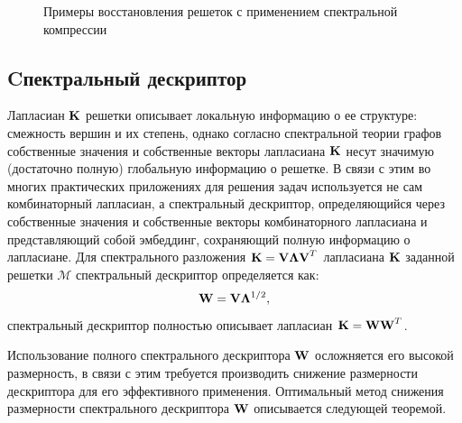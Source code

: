 \begin{figure}[!htb]
\caption{Примеры восстановления решеток с применением спектральной компрессии}
\end{figure}

\subsection{Cпектральный дескриптор}

Лапласиан $\textbf{K}$ решетки описывает локальную информацию о ее структуре: смежность вершин и их степень, однако согласно спектральной теории графов собственные значения и собственные векторы лапласиана $\textbf{K}$ несут значимую (достаточно полную) глобальную информацию о решетке.  В связи с этим во многих практических приложениях для решения задач используется не сам комбинаторный лапласиан, а спектральный дескриптор, определяющийся через собственные значения и собственные векторы комбинаторного лапласиана и представляющий собой эмбеддинг, сохраняющий полную информацию о лапласиане.
Для спектрального разложения $\textbf{K} = \textbf{V}  \bm{\Lambda} \textbf{V}^T $ лапласиана $\textbf{K}$ заданной решетки $\mathcal{M}$ спектральный дескриптор определяется как:
	$$\textbf{W} = \textbf{V} \bm{\Lambda}^{1/2},$$
спектральный дескриптор полностью описывает лапласиан $\textbf{K} = \textbf{W} \textbf{W}^T$.

Использование полного спектрального дескриптора $\textbf{W}$ осложняется его высокой размерность, в связи с этим требуется производить снижение размерности дескриптора для его эффективного применения.
Оптимальный метод снижения размерности спектрального дескриптора $\textbf{W}$ описывается следующей теоремой.\medskip

